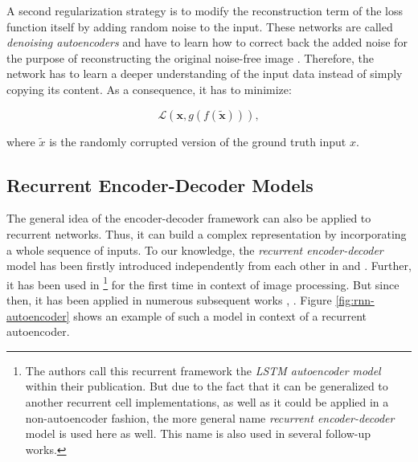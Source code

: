 A second regularization strategy is to modify the reconstruction term of the loss function itself by adding random noise to the input. These networks are called \textit{denoising autoencoders} and have to learn how to correct back the added noise for the purpose of reconstructing the original noise-free image \parencite[p. 507]{deep_learning}. Therefore, the network has to learn a deeper understanding of the input data instead of simply copying its content. As a consequence, it has to minimize:

\begin{equation} \label{eq:autoenc-denoise}
	\mathcal{L}(\textbf{x}, g(f(\tilde{\textbf{x}}))) ,
\end{equation}

where $ \tilde{x} $ is the randomly corrupted version of the ground truth input $ x $.


\subsection{Recurrent Encoder-Decoder Models} \label{sec:rnn_enc_dec}

The general idea of the encoder-decoder framework can also be applied to recurrent networks. Thus, it can build a complex representation by incorporating a whole sequence of inputs. To our knowledge, the \textit{recurrent encoder-decoder} model has been firstly introduced independently from each other in \parencite{brnn_fist} and \parencite{brnn_second}. Further, it has been used in  \parencite{unsup_learn_lstm}\footnote{The authors call this recurrent framework the \textit{LSTM autoencoder model} within their publication. But due to the fact that it can be generalized to another recurrent cell implementations, as well as it could be applied in a non-autoencoder fashion, the more general name \textit{recurrent encoder-decoder} model is used here as well. This name is also used in several follow-up works.} for the first time in context of image processing. But since then, it has been applied in numerous subsequent works \parencite{rnn-enc-dec1}, \parencite{rnn-enc-dec2}. Figure \ref{fig:rnn-autoencoder} shows an example of such a model in context of a recurrent autoencoder.

